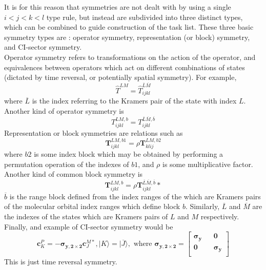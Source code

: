 \documentclass[12pt]{article}
\begin{document}
\noindent It is for this reason that symmetries are not dealt with by using a
single $i<j<k<l$ type rule, but instead are subdivided into three distinct
types, which can be combined to guide construction of the task list. These
three basic symmetry types are : operator symmetry, representation (or block)
symmetry, and CI-sector symmetry.\\ 

\noindent Operator symmetry refers to transformations on the action of the
operator, and equivalences between operators which act on different
combinations of states (dictated by time reversal, or potentially spatial
symmetry). For example,
\begin{equation}
\hat{T}^{LM} = \hat{T}^{\overline{L}\overline{M}}_{ijkl} 
\end{equation}
\noindent where $\overline{L}$ is the index referring to the Kramers pair of the state with index $L$.
Another kind of operator symmetry is
\begin{equation}
T^{LM, b}_{ijkl} = T^{\overline{L}\overline{M}, \overline{b}}_{ijkl} 
\end{equation}
Representation or block symmetries are relations such as 
\begin{equation}
\mathbf{T}^{LM, b1}_{ijkl} = \rho \mathbf{T}^{LM, b2}_{klij} 
\end{equation}
where $b2$ is some index block which may be obtained by performing a
permutation operation of the indexes of $b1$, and $\rho$ is some multiplicative factor.
Another kind of common block symmetry is
\begin{equation}
\mathbf{T}^{LM, b}_{ijkl} = \rho \mathbf{T}^{\overline{L}\overline{M}, \overline{b}}_{ijkl}* 
\end{equation}
$\overline{b}$ is the range
block defined from the index ranges of the which are Kramers pairs of the
molecular orbital index ranges which define block $b$. Similarly, $\overline{L}$
and  $\overline{M}$ are the indexes of the states which are Kramers pairs of
$L$ and $M$ respectively.\\

\noindent Finally, and example of CI-sector symmetry would be
\begin{equation*} 
\mathbf{c}_{K}^{P} =  -\boldsymbol{\sigma_{y,2\times 2}}\mathbf{c}_{J}^{M*}, 
|K\rangle =  |\overline{J}\rangle, 
\text{ \ \ \ where  \ \ \ } 
\boldsymbol{\sigma_{y,2\times 2}} = 
\begin{bmatrix}
\boldsymbol{\sigma_{y}} && \mathbf{0} \\ 
\mathbf{0} && \boldsymbol{\sigma_{y}} \\
\end{bmatrix}
\end{equation*}
\noindent This is just time reversal symmetry.\\
\end{document}
